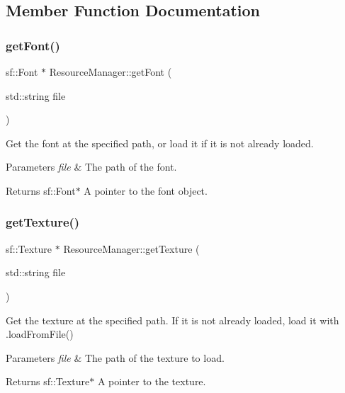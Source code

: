 \subsection{Member Function Documentation}
\mbox{\label{class_resource_manager_aa0b060cd409f3cfefc85b5fc3b17f5bb}} 
\subsubsection{\texorpdfstring{get\+Font()}{getFont()}}
{\footnotesize\ttfamily sf\+::\+Font $\ast$ Resource\+Manager\+::get\+Font (\begin{DoxyParamCaption}\item[{std\+::string}]{file }\end{DoxyParamCaption})}



Get the font at the specified path, or load it if it is not already loaded. 


\begin{DoxyParams}{Parameters}
{\em file} & The path of the font. \\
\hline
\end{DoxyParams}
\begin{DoxyReturn}{Returns}
sf\+::\+Font$\ast$ A pointer to the font object. 
\end{DoxyReturn}
\mbox{\label{class_resource_manager_ad393b13cf5d0f81de842fb8bfc3ccb09}} 
\subsubsection{\texorpdfstring{get\+Texture()}{getTexture()}}
{\footnotesize\ttfamily sf\+::\+Texture $\ast$ Resource\+Manager\+::get\+Texture (\begin{DoxyParamCaption}\item[{std\+::string}]{file }\end{DoxyParamCaption})}



Get the texture at the specified path. If it is not already loaded, load it with .load\+From\+File() 


\begin{DoxyParams}{Parameters}
{\em file} & The path of the texture to load. \\
\hline
\end{DoxyParams}
\begin{DoxyReturn}{Returns}
sf\+::\+Texture$\ast$ A pointer to the texture. 
\end{DoxyReturn}
\mbox{\label{class_resource_manager_ad543c034d0cef8fd2f3e8f32b49ebb3f}} 
